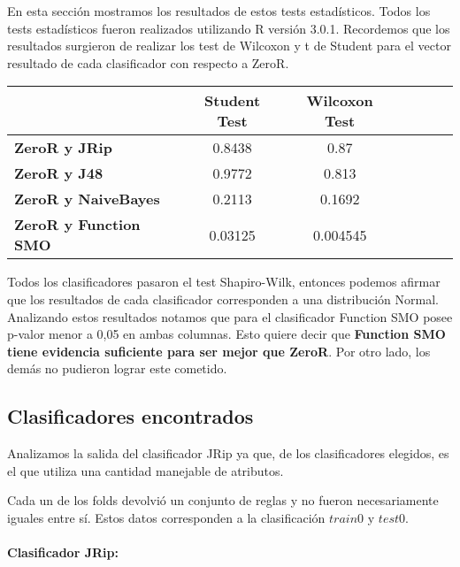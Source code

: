 En esta sección mostramos los resultados de estos tests estadísticos. Todos los tests estadísticos fueron realizados utilizando R versión 3.0.1. Recordemos que los resultados surgieron de realizar los test de Wilcoxon y t de Student para el vector resultado de cada clasificador con respecto a ZeroR.


\begin{table}[H]
\centering
\begin{tabular}{|l|c|c|c|c|c|c|}
\hline
\textbf{}  & \textbf{Student Test} & \textbf{Wilcoxon Test} \\ \hline
\textbf{ZeroR y JRip}  & 0.8438 & 0.87 \\ \hline
\textbf{ZeroR y J48}  & 0.9772 & 0.813 \\ \hline
\textbf{ZeroR y NaiveBayes}  & 0.2113 & 0.1692 \\ \hline
\textbf{ZeroR y Function SMO}  & 0.03125 & 0.004545 \\ \hline
\end{tabular}
\end{table}

Todos los clasificadores pasaron el test Shapiro-Wilk, entonces podemos afirmar que los resultados de cada clasificador corresponden a una distribución Normal. Analizando estos resultados notamos que para el clasificador Function SMO posee p-valor menor a 0,05 en ambas columnas. Esto quiere decir que \textbf{Function SMO tiene evidencia suficiente para ser mejor que ZeroR}. Por otro lado, los demás no pudieron lograr este cometido. 

\subsection{Clasificadores encontrados}

Analizamos la salida del clasificador JRip ya que, de los clasificadores elegidos, es el que utiliza una cantidad manejable de atributos. 

Cada un de los folds devolvió un conjunto de reglas y no fueron necesariamente iguales entre sí. Estos datos corresponden a la clasificación $train 0$ y $test 0$.

\paragraph*{Clasificador JRip:}

